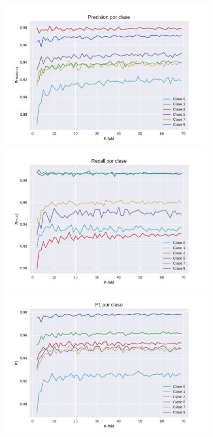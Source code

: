 {\centering
\includegraphics[width=0.8\textwidth]{informe/imagenes/kfold/reentrega/precision.pdf}
}
{\centering
\includegraphics[width=0.8\textwidth]{informe/imagenes/kfold/reentrega/recall.pdf}
}
{\centering
\includegraphics[width=0.8\textwidth]{informe/imagenes/kfold/reentrega/f1.pdf}
}


